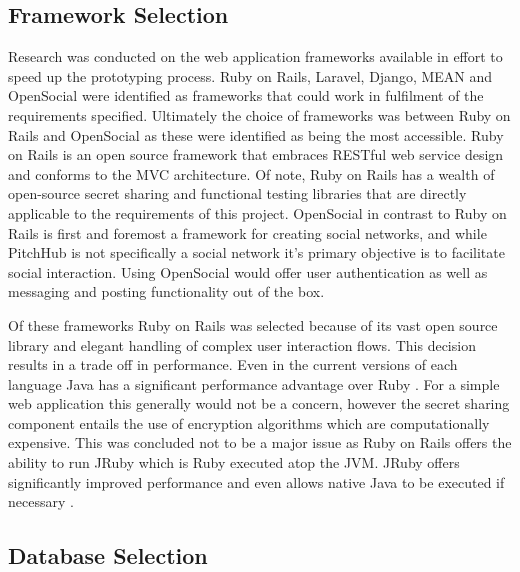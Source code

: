 \subsection{Framework Selection}\label{SS:frameworkSelection}

Research was conducted on the web application frameworks available in effort to speed up the prototyping process. Ruby on Rails, Laravel, Django, MEAN and OpenSocial were identified as frameworks that could work in fulfilment of the requirements specified. Ultimately the choice of frameworks was between Ruby on Rails and OpenSocial as these were identified as being the most accessible. Ruby on Rails is an open source framework that embraces RESTful web service design and conforms to the MVC architecture. Of note, Ruby on Rails has a wealth of open-source secret sharing and functional testing libraries that are directly applicable to the requirements of this project. OpenSocial in contrast to Ruby on Rails is first and foremost a framework for creating social networks, and while PitchHub is not specifically a social network it's primary objective is to facilitate social interaction. Using OpenSocial would offer user authentication as well as messaging and posting functionality out of the box. 
\par
Of these frameworks Ruby on Rails was selected because of its vast open source library and elegant handling of complex user interaction flows. This decision results in a trade off in performance. Even in the current versions of each language Java has a significant  performance advantage over Ruby \cite{Perfo1:online}. For a simple web application this generally would not be a concern, however the secret sharing component entails the use of encryption algorithms which are computationally expensive. This was concluded not to be a major issue as Ruby on Rails offers the ability to run JRuby which is Ruby executed atop the JVM. JRuby offers significantly improved performance and even allows native Java to be executed if necessary \cite{Jruby:online}.

\subsection{Database Selection}\label{SS:databaseSelection}

